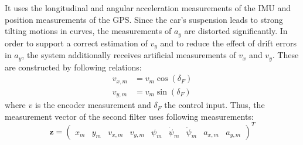 It uses the longitudinal and angular acceleration measurements of the IMU and position measurements of the GPS. Since the car's suspension leads to strong tilting motions in curves, the measurements of $a_y$ are distorted significantly. In order to support a correct estimation of $v_y$ and to reduce the effect of drift errors in $a_y$, the system additionally receives artificial measurements of $v_x$ and $v_y$. These are constructed by following relations:
\begin{align*}
v_{x,m} &= v_m\cos(\delta_F)\\
v_{y,m} &= v_m\sin(\delta_F)
\end{align*}
where $v$ is the encoder measurement and $\delta_F$ the control input.
Thus, the measurement vector of the second filter uses following measurements:
\begin{equation}
\bm{z}=\begin{pmatrix}x_m&y_m&v_{x,m}&v_{y,m}&\psi_m&\dot\psi_m&\ddot\psi_m&a_{x,m}&a_{y,m}\end{pmatrix}^T
\end{equation}
